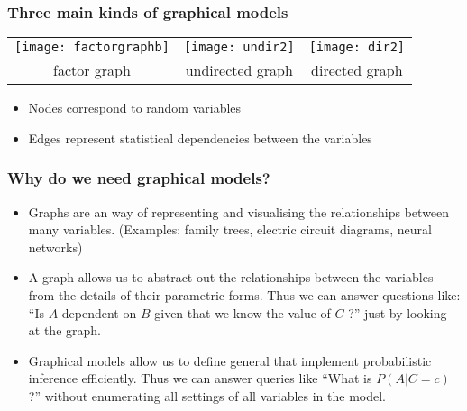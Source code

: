 





\begin{frame}
\frametitle{Three main kinds of graphical models}

\begin{center}
\begin{tabular}{ccc}
\texttt{[image: factorgraphb]} &
\texttt{[image: undir2]} &
\texttt{[image: dir2]} \\
factor graph & undirected graph & directed graph 
\end{tabular}
\end{center}

\vspace*{2em}

\begin{itemize}
\item Nodes correspond to random variables
\item Edges represent statistical dependencies between the variables
\end{itemize}

\end{frame}

\begin{frame}
\frametitle{Why do we need graphical models?}

\begin{itemize}
\item Graphs are an  way of representing and visualising the
  relationships   between many variables. (Examples: family trees,
  electric circuit diagrams, neural networks)
\item A graph allows us to abstract out the 
  relationships between the variables from the details of their
  parametric forms. Thus we can answer questions like: ``Is $A$ dependent
  on $B$ given that we know the value of $C$ ?'' just by looking at the
  graph. 
\item Graphical models allow us to define general  that implement probabilistic inference
    efficiently. Thus we can answer queries like ``What is
    $P(A|C=c)$?'' without enumerating all settings of all variables in
    the model.
\end{itemize}

\vfill

\centerline{}



\end{frame}


